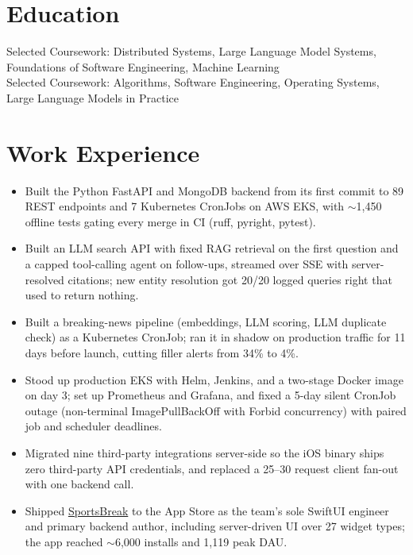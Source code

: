\documentclass[11pt, letterpaper]{article}
\begin{document}

\section{Education}
Selected Coursework: Distributed Systems, Large Language Model Systems, Foundations of Software Engineering, Machine Learning\\[1pt]
Selected Coursework: Algorithms, Software Engineering, Operating Systems, Large Language Models in Practice

\section{Work Experience}
\begin{itemize}
  \item Built the Python FastAPI and MongoDB backend from its first commit to 89 REST endpoints and 7 Kubernetes CronJobs on AWS EKS, with $\sim$1{,}450 offline tests gating every merge in CI (ruff, pyright, pytest).
  \item Built an LLM search API with fixed RAG retrieval on the first question and a capped tool-calling agent on follow-ups, streamed over SSE with server-resolved citations; new entity resolution got 20/20 logged queries right that used to return nothing.
  \item Built a breaking-news pipeline (embeddings, LLM scoring, LLM duplicate check) as a Kubernetes CronJob; ran it in shadow on production traffic for 11 days before launch, cutting filler alerts from 34\% to 4\%.
  \item Stood up production EKS with Helm, Jenkins, and a two-stage Docker image on day 3; set up Prometheus and Grafana, and fixed a 5-day silent CronJob outage (non-terminal ImagePullBackOff with Forbid concurrency) with paired job and scheduler deadlines.
  \item Migrated nine third-party integrations server-side so the iOS binary ships zero third-party API credentials, and replaced a 25--30 request client fan-out with one backend call.
  \item Shipped \href{https://apps.apple.com/app/id6762649287}{SportsBreak} to the App Store as the team's sole SwiftUI engineer and primary backend author, including server-driven UI over 27 widget types; the app reached $\sim$6{,}000 installs and 1{,}119 peak DAU.
\end{itemize}
\end{document}
